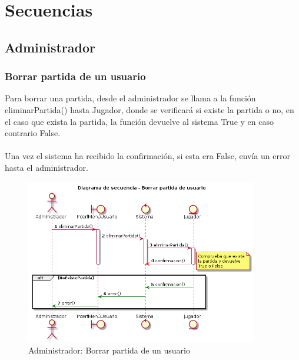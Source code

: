 \section{Secuencias}\label{sec:uc0}


\subsection{Administrador}\label{sec:uc0}
\subsubsection{Borrar partida de un usuario}

Para borrar una partida, desde el administrador se llama a la función eliminarPartida() hasta Jugador, donde se verificará si existe la partida o no, en el caso que exista la partida, la función devuelve al sistema True y en caso contrario False.
\\
\\Una vez el sistema ha recibido la confirmación, si esta era False, envía un error hasta el administrador.
\begin{figure} [ht]
	\centering
	\includegraphics[width=0.9\textwidth]{./imatges/administrador/Borrar_partida_de_usuario.png}
	\caption{Administrador: Borrar partida de un usuario}
\end{figure}


\newpage
